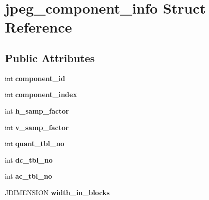 \hypertarget{structjpeg__component__info}{}\section{jpeg\+\_\+component\+\_\+info Struct Reference}
\label{structjpeg__component__info}
\subsection*{Public Attributes}
\begin{DoxyCompactItemize}
\item 
int {\bfseries component\+\_\+id}\hypertarget{structjpeg__component__info_a205782ff7ec47c58cb470f121247ea8d}{}\label{structjpeg__component__info_a205782ff7ec47c58cb470f121247ea8d}

\item 
int {\bfseries component\+\_\+index}\hypertarget{structjpeg__component__info_aa29b9e1c664a9b0b8a1c3069ad167817}{}\label{structjpeg__component__info_aa29b9e1c664a9b0b8a1c3069ad167817}

\item 
int {\bfseries h\+\_\+samp\+\_\+factor}\hypertarget{structjpeg__component__info_a3a8e122fa2eee3c7bede586d371fe202}{}\label{structjpeg__component__info_a3a8e122fa2eee3c7bede586d371fe202}

\item 
int {\bfseries v\+\_\+samp\+\_\+factor}\hypertarget{structjpeg__component__info_a83b263da2a749a8fe96be728889af0df}{}\label{structjpeg__component__info_a83b263da2a749a8fe96be728889af0df}

\item 
int {\bfseries quant\+\_\+tbl\+\_\+no}\hypertarget{structjpeg__component__info_a0a9d70b6a95d3ca58a34a7ea8bfefbf8}{}\label{structjpeg__component__info_a0a9d70b6a95d3ca58a34a7ea8bfefbf8}

\item 
int {\bfseries dc\+\_\+tbl\+\_\+no}\hypertarget{structjpeg__component__info_a304fa583caa0601abc7077a218988854}{}\label{structjpeg__component__info_a304fa583caa0601abc7077a218988854}

\item 
int {\bfseries ac\+\_\+tbl\+\_\+no}\hypertarget{structjpeg__component__info_adfea67573a39b232c3d82ac808539a83}{}\label{structjpeg__component__info_adfea67573a39b232c3d82ac808539a83}

\item 
J\+D\+I\+M\+E\+N\+S\+I\+ON {\bfseries width\+\_\+in\+\_\+blocks}\hypertarget{structjpeg__component__info_a059454e8192effeabc6eab34e2ad198d}{}\label{structjpeg__component__info_a059454e8192effeabc6eab34e2ad198d}


\end{DoxyCompactItemize}
